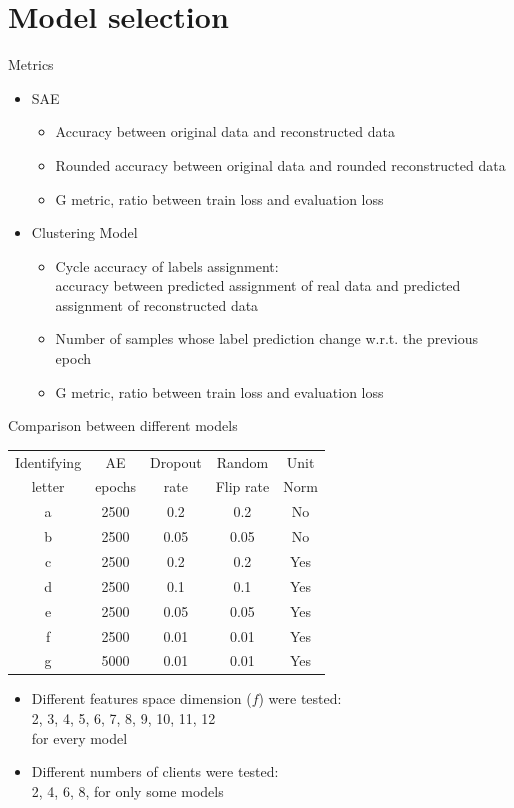 \documentclass{beamer}
\begin{document}
\section{Model selection}

\begin{frame}{Metrics}
	\begin{itemize}
		\item SAE
		\begin{itemize}
			\item Accuracy between original data and reconstructed data
			\item Rounded accuracy between original data and rounded reconstructed data
			\item G metric, ratio between train loss and evaluation loss
		\end{itemize}
		\item Clustering Model
		\begin{itemize}
			\item Cycle accuracy of labels assignment:\\
				accuracy between predicted assignment of real data and
				predicted assignment of reconstructed data
			\item Number of samples whose label prediction change w.r.t. the previous epoch
			\item G metric, ratio between train loss and evaluation loss
		\end{itemize}
	\end{itemize}
\end{frame}

\begin{frame}{Comparison between different models}
	\begin{center}
		\begin{tabular}{ | c | c | c | c | c | }
			\hline
			Identifying & AE & Dropout & Random & Unit \\
			letter & epochs & rate & Flip rate & Norm \\
			\hline
			\hline
			a & 2500 & 0.2 & 0.2 & No\\
			b & 2500 & 0.05 & 0.05 & No\\
			c & 2500 & 0.2 & 0.2 & Yes\\
			d & 2500 & 0.1 & 0.1 & Yes\\
			e & 2500 & 0.05 & 0.05 & Yes\\
			f & 2500 & 0.01 & 0.01 & Yes\\
			g & 5000 & 0.01 & 0.01 & Yes\\
			\hline
		\end{tabular}
	\end{center}
	\begin{itemize}
		\item Different features space dimension ($f$) were tested:\\
			2, 3, 4, 5, 6, 7, 8, 9, 10, 11, 12\\
			for every model 
		\item Different numbers of clients were tested:\\
			2, 4, 6, 8, for only some models
	\end{itemize}
\end{frame}
\end{document}
